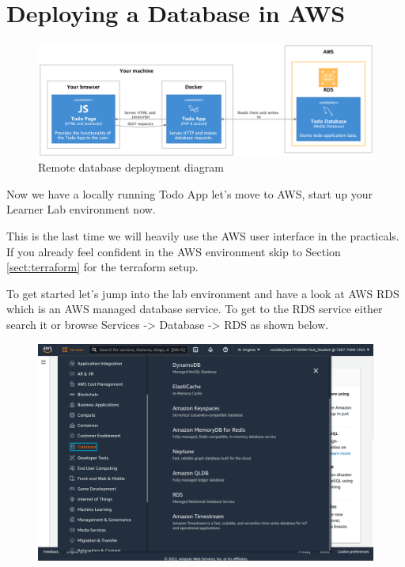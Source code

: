 \documentclass{csse4400}
\begin{document}
\section{Deploying a Database in AWS}



\begin{figure}[ht]
\includegraphics[width=\textwidth]{diagrams/remotedb}
\caption{Remote database deployment diagram}
\end{figure}

Now we have a locally running Todo App let's move to AWS, start up your Learner Lab environment now.

This is the last time we will heavily use the AWS user interface in the practicals. If you already feel confident in the AWS environment skip to Section \ref{sect:terraform} for the terraform setup.


To get started let's jump into the lab environment and have a look at AWS RDS which is an AWS managed database service. To get to the RDS service either search it or browse Services -> Database -> RDS as shown below.

\begin{figure}[H]
\includegraphics[width=\textwidth]{images/aws_1}
\end{figure}
\end{document}
